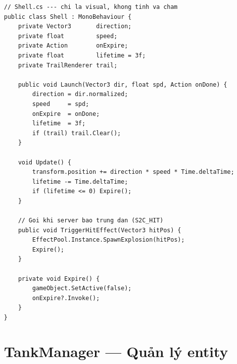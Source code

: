 \documentclass[12pt,a4paper]{report}
\begin{document}
\begin{lstlisting}[style=bashStyle, caption={Shell.cs --- visual đạn bay (không có vật lý thực)}, label={lst:shell}]
// Shell.cs --- chi la visual, khong tinh va cham
public class Shell : MonoBehaviour {
    private Vector3       direction;
    private float         speed;
    private Action        onExpire;
    private float         lifetime = 3f;
    private TrailRenderer trail;

    public void Launch(Vector3 dir, float spd, Action onDone) {
        direction = dir.normalized;
        speed     = spd;
        onExpire  = onDone;
        lifetime  = 3f;
        if (trail) trail.Clear();
    }

    void Update() {
        transform.position += direction * speed * Time.deltaTime;
        lifetime -= Time.deltaTime;
        if (lifetime <= 0) Expire();
    }

    // Goi khi server bao trung dan (S2C_HIT)
    public void TriggerHitEffect(Vector3 hitPos) {
        EffectPool.Instance.SpawnExplosion(hitPos);
        Expire();
    }

    private void Expire() {
        gameObject.SetActive(false);
        onExpire?.Invoke();
    }
}
\end{lstlisting}

\section{TankManager --- Quản lý entity}
\end{document}
